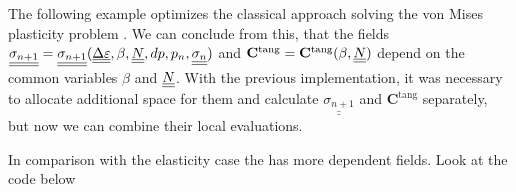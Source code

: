 \documentclass[12pt]{article}
\newcommand{\todolink}{\todo[fancyline, size=\scriptsize]{TOCITE}}
\begin{document}
The following example optimizes the classical approach solving the von Mises plasticity problem \todolink.
We can conclude from this, that the fields $\underline{\underline{\sigma_{n+1}}} = \underline{\underline{\sigma_{n+1}}}(\underline{\underline{\Delta\varepsilon}}, \beta, \underline{\underline{N}}, dp, p_n, \underline{\underline{\sigma_n}})$ and $\mathbf{C}^\text{tang} = \mathbf{C}^\text{tang}(\beta, \underline{\underline{N}})$ depend on the common variables $\beta$ and $\underline{\underline{N}}$. With the previous implementation, it was necessary to allocate additional space for them and calculate $\underline{\underline{\sigma_{n+1}}}$ and $\mathbf{C}^\text{tang}$ separately, but now we can combine their local evaluations.

In comparison with the elasticity case the   has more dependent fields. Look at the code below
\end{document}
